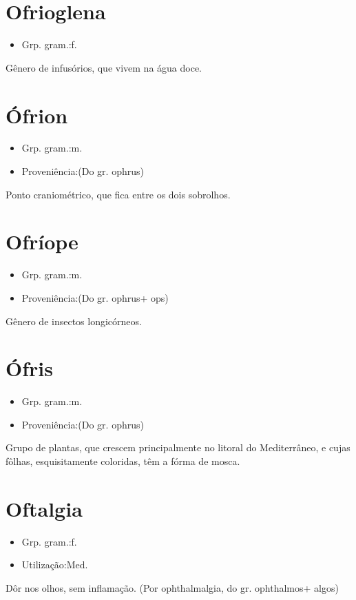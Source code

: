 \section{Ofrioglena}
\begin{itemize}
\item {Grp. gram.:f.}
\end{itemize}
Gênero de infusórios, que vivem na água doce.
\section{Ófrion}
\begin{itemize}
\item {Grp. gram.:m.}
\end{itemize}
\begin{itemize}
\item {Proveniência:(Do gr. \textunderscore ophrus\textunderscore )}
\end{itemize}
Ponto craniométrico, que fica entre os dois sobrolhos.
\section{Ofríope}
\begin{itemize}
\item {Grp. gram.:m.}
\end{itemize}
\begin{itemize}
\item {Proveniência:(Do gr. \textunderscore ophrus\textunderscore  + \textunderscore ops\textunderscore )}
\end{itemize}
Gênero de insectos longicórneos.
\section{Ófris}
\begin{itemize}
\item {Grp. gram.:m.}
\end{itemize}
\begin{itemize}
\item {Proveniência:(Do gr. \textunderscore ophrus\textunderscore )}
\end{itemize}
Grupo de plantas, que crescem principalmente no litoral do Mediterrâneo, e cujas fôlhas, esquisitamente coloridas, têm a fórma de mosca.
\section{Oftalgia}
\begin{itemize}
\item {Grp. gram.:f.}
\end{itemize}
\begin{itemize}
\item {Utilização:Med.}
\end{itemize}
Dôr nos olhos, sem inflamação.
(Por \textunderscore ophthalmalgia\textunderscore , do gr. \textunderscore ophthalmos\textunderscore  + \textunderscore algos\textunderscore )
